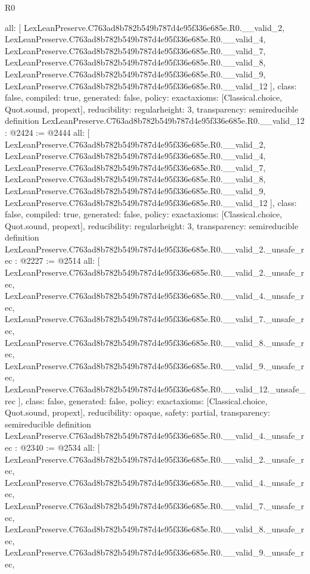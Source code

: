 \begin{lexlean}{R0}
\begin{coremodule}
{  all: [
    LexLeanPreserve.C763ad8b782b549b787d4e95f336e685e.R0.__valid_2,
    LexLeanPreserve.C763ad8b782b549b787d4e95f336e685e.R0.__valid_4,
    LexLeanPreserve.C763ad8b782b549b787d4e95f336e685e.R0.__valid_7,
    LexLeanPreserve.C763ad8b782b549b787d4e95f336e685e.R0.__valid_8,
    LexLeanPreserve.C763ad8b782b549b787d4e95f336e685e.R0.__valid_9,
    LexLeanPreserve.C763ad8b782b549b787d4e95f336e685e.R0.__valid_12
  ],
  class: false,
  compiled: true,
  generated: false,
  policy: exact{axioms: [Classical.choice, Quot.sound, propext]},
  reducibility: regular{height: 3},
  transparency: semireducible
}
definition LexLeanPreserve.C763ad8b782b549b787d4e95f336e685e.R0.__valid_12 : @2424 := @2444 {
  all: [
    LexLeanPreserve.C763ad8b782b549b787d4e95f336e685e.R0.__valid_2,
    LexLeanPreserve.C763ad8b782b549b787d4e95f336e685e.R0.__valid_4,
    LexLeanPreserve.C763ad8b782b549b787d4e95f336e685e.R0.__valid_7,
    LexLeanPreserve.C763ad8b782b549b787d4e95f336e685e.R0.__valid_8,
    LexLeanPreserve.C763ad8b782b549b787d4e95f336e685e.R0.__valid_9,
    LexLeanPreserve.C763ad8b782b549b787d4e95f336e685e.R0.__valid_12
  ],
  class: false,
  compiled: true,
  generated: false,
  policy: exact{axioms: [Classical.choice, Quot.sound, propext]},
  reducibility: regular{height: 3},
  transparency: semireducible
}
definition LexLeanPreserve.C763ad8b782b549b787d4e95f336e685e.R0.__valid_2._unsafe_rec : @2227 := @2514 {
  all: [
    LexLeanPreserve.C763ad8b782b549b787d4e95f336e685e.R0.__valid_2._unsafe_rec,
    LexLeanPreserve.C763ad8b782b549b787d4e95f336e685e.R0.__valid_4._unsafe_rec,
    LexLeanPreserve.C763ad8b782b549b787d4e95f336e685e.R0.__valid_7._unsafe_rec,
    LexLeanPreserve.C763ad8b782b549b787d4e95f336e685e.R0.__valid_8._unsafe_rec,
    LexLeanPreserve.C763ad8b782b549b787d4e95f336e685e.R0.__valid_9._unsafe_rec,
    LexLeanPreserve.C763ad8b782b549b787d4e95f336e685e.R0.__valid_12._unsafe_rec
  ],
  class: false,
  generated: false,
  policy: exact{axioms: [Classical.choice, Quot.sound, propext]},
  reducibility: opaque{},
  safety: partial,
  transparency: semireducible
}
definition LexLeanPreserve.C763ad8b782b549b787d4e95f336e685e.R0.__valid_4._unsafe_rec : @2340 := @2534 {
  all: [
    LexLeanPreserve.C763ad8b782b549b787d4e95f336e685e.R0.__valid_2._unsafe_rec,
    LexLeanPreserve.C763ad8b782b549b787d4e95f336e685e.R0.__valid_4._unsafe_rec,
    LexLeanPreserve.C763ad8b782b549b787d4e95f336e685e.R0.__valid_7._unsafe_rec,
    LexLeanPreserve.C763ad8b782b549b787d4e95f336e685e.R0.__valid_8._unsafe_rec,
    LexLeanPreserve.C763ad8b782b549b787d4e95f336e685e.R0.__valid_9._unsafe_rec,
}
\end{coremodule}
\end{lexlean}
